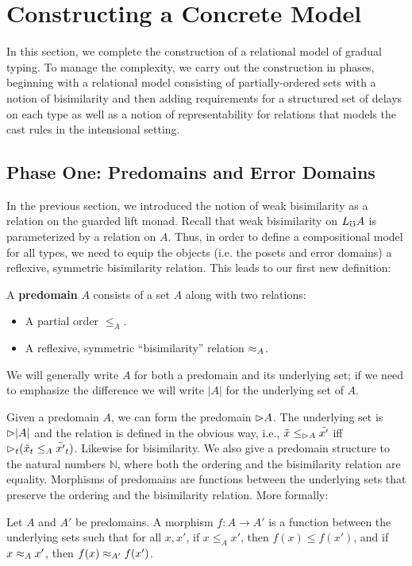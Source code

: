 \section{Constructing a Concrete Model}\label{sec:concrete-model}

In this section, we complete the construction of a relational model of gradual
typing. To manage the complexity, we carry out the construction in phases,
beginning with a relational model consisting of partially-ordered sets with a
notion of bisimilarity and then adding requirements for a structured set of
delays on each type as well as a notion of representability for relations that
models the cast rules in the intensional setting.

\subsection{Phase One: Predomains and Error Domains}

In the previous section, we introduced the notion of weak bisimilarity as a
relation on the guarded lift monad. Recall that weak bisimilarity on $L_\mho A$ is
parameterized by a relation on $A$. Thus, in order to define a compositional
model for all types, we need to equip the objects (i.e. the posets and error
domains) a reflexive, symmetric bisimilarity relation. This leads to our first
new definition: 

\begin{definition}
A \textbf{predomain} $A$ consists of a set $A$ along with two relations:
\begin{itemize}
    \item A partial order $\le_A$.
    \item A reflexive, symmetric ``bisimilarity'' relation $\approx_A$.
\end{itemize}
\end{definition}

We will generally write $A$ for both a predomain and its underlying set; if we
need to emphasize the difference we will write $|A|$ for the underlying set of
$A$.

Given a predomain $A$, we can form the predomain ${\vartriangleright} A$. The underlying set
is ${\vartriangleright} |A|$ and the relation is defined in the obvious way, i.e., $\tilde{x}
\le_{{\vartriangleright} A} \tilde{x'}$ iff ${\vartriangleright}_t(\tilde{x}_t \le_A \tilde{x'}_t)$.
Likewise for bisimilarity.
%
We also give a predomain structure to the natural numbers $\mathbb{N}$, where
both the ordering and the bisimilarity relation are equality.
%
Morphisms of predomains are functions between the underlying sets that preserve
the ordering and the bisimilarity relation. More formally:
%
\begin{definition}
Let $A$ and $A'$ be predomains.
A morphism $f : A \to A'$ is a function between the underlying sets such that for all $x, x'$,
if $x \le_A x'$, then $f(x) \le f(x')$, and if $x \approx_A x'$, then $f(x) \approx_{A'} f(x')$.
\end{definition}

